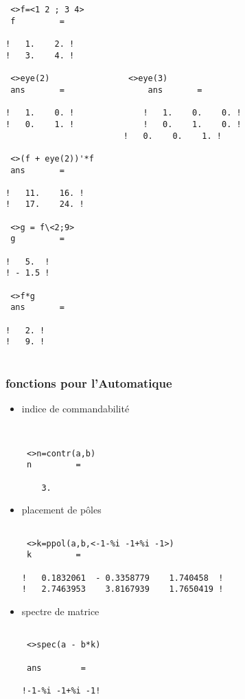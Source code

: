 \begin{verbatim}

 
 <>f=<1 2 ; 3 4>
 f         =
 
!   1.    2. !
!   3.    4. !
 
 <>eye(2)				 <>eye(3)
 ans       =				 ans       =
 
!   1.    0. !				!   1.    0.    0. !
!   0.    1. !				!   0.    1.    0. !
 				        !   0.    0.    1. !

 <>(f + eye(2))'*f
 ans       =
 
!   11.    16. !
!   17.    24. !
 
 <>g = f\<2;9>
 g         =
 
!   5.  !
! - 1.5 !
 
 <>f*g
 ans       =
 
!   2. !
!   9. !
 

\end{verbatim}


\subsubsection{fonctions pour l'Automatique}

\begin{itemize}

\item indice de commandabilit\'e

\begin{verbatim}
 
 
 <>n=contr(a,b)
 n         =
 
    3.  
\end{verbatim}

\item placement de p\^oles

\begin{verbatim}

 <>k=ppol(a,b,<-1-%i -1+%i -1>)
 k         =
 
!   0.1832061  - 0.3358779    1.740458  !
!   2.7463953    3.8167939    1.7650419 !

\end{verbatim}

\item spectre de matrice

\begin{verbatim}

 <>spec(a - b*k)

 ans        =

!-1-%i -1+%i -1!

\end{verbatim}

\end{itemize}





